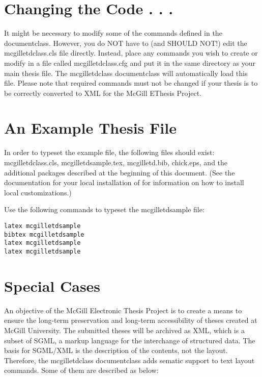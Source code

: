 \documentclass[12pt,Bold,letterpaper,TexShade]{mcgilletdclass}
\begin{document}
\section{Changing the Code . . .}
It might be necessary to modify some of the commands defined in the
documentclass. However, you do NOT have to (and SHOULD NOT!) edit
the mcgilletdclass.cls file directly. Instead, place any commands
you wish to create or modify in a file called mcgilletdclass.cfg and
put it in the same directory as your main thesis file.  The mcgilletdclass
documentclass will automatically load this file.  Please note that 
required commands must not be changed if your thesis is to be correctly
converted to XML for the McGill EThesis Project.

\section{An Example Thesis File}
In order to typeset the example file, the following files should exist:
mcgilletdclass.cls, mcgilletdsample.tex, mcgilletd.bib, chick.eps, and the additional
packages described at the beginning of this document.  (See the documentation
for your local installation of \LaTeXe for information on how to install
local customizations.)

Use the following commands to typeset the mcgilletdsample file:

\begin{verbatim}
latex mcgilletdsample
bibtex mcgilletdsample
latex mcgilletdsample
latex mcgilletdsample
\end{verbatim}

\section{Special Cases}
An objective of the McGill Electronic Thesis Project is to create a means to 
ensure the long-term preservation and long-term accessibility of theses created 
at McGill University. The submitted theses will be archived as XML, which is a 
subset of SGML, a markup language for the interchange of structured data.  
The basis for SGML/XML is the description of the contents, not the layout.  Therefore,
the mcgilletdclass documentclass adds sematic support to text layout commands. Some of them
are described as below:
\end{document}
